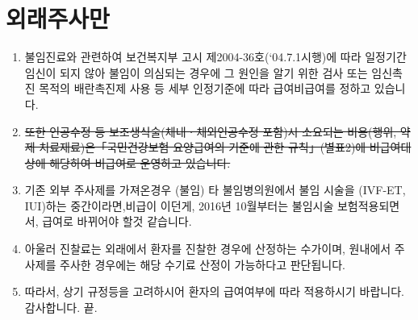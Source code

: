 \section{외래주사만}
%
{\begin{enumerate}\tightlist
\item 불임진료와 관련하여 보건복지부 고시 제2004-36호(‘04.7.1시행)에 따라 일정기간 임신이 되지 않아 불임이 의심되는 경우에 그 원인을 알기 위한 검사 또는 임신촉진 목적의 배란촉진제 사용 등 세부 인정기준에 따라 급여\bullet 비급여를 정하고 있습니다.
\item \sout{또한 인공수정 등 보조생식술(체내ㆍ체외인공수정 포함)시 소요되는 비용(행위, 약제 치료재료)은「국민건강보험 요양급여의 기준에 관한 규칙」(별표2)에 비급여대상에 해당하여 비급여로 운영하고 있습니다.}
\item 기존 외부 주사제를 가져온경우 (불임) 타 불임병의원에서 불임 시술을 (IVF-ET, IUI)하는 중간이라면,비급이  이던게, 2016년 10월부터는 불임시술 보험적용되면서, 급여로 바뀌어야 할것 같습니다.
\item 아울러 진찰료는 외래에서 환자를 진찰한 경우에 산정하는 수가이며, 원내에서 주사제를 주사한 경우에는 해당 수기료 산정이 가능하다고 판단됩니다.
\item 따라서, 상기 규정등을 고려하시어 환자의 급여여부에 따라 적용하시기 바랍니다. 감사합니다. 끝.
\end{enumerate}
}

